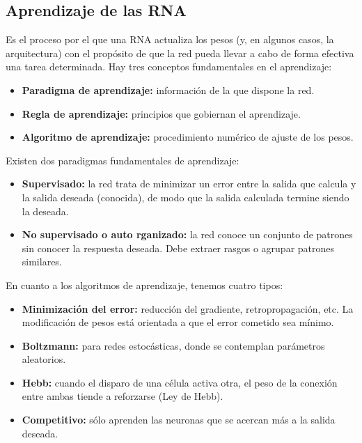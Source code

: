 \documentclass[12pt]{book} %
\begin{document}
		\subsection{Aprendizaje de las RNA}
			 Es el proceso por el que una RNA actualiza los pesos (y, en algunos casos, la arquitectura) con el propósito de que la red pueda llevar a 
			 cabo de forma efectiva una tarea determinada.
			 Hay tres conceptos fundamentales en el aprendizaje:
			 \begin{multicols}{2}
				\begin{itemize}
			 		\item \textbf{Paradigma de aprendizaje:} información de la que dispone la red.
			 	   	\item \textbf{Regla de aprendizaje:} principios que gobiernan el aprendizaje.
			   		 \item \textbf{Algoritmo de aprendizaje:} procedimiento numérico de ajuste de los pesos.
			 	\end{itemize}
			\end{multicols}
			Existen dos paradigmas fundamentales de aprendizaje:
			\begin{multicols}{2}
				\begin{itemize}
			 		\item \textbf{Supervisado:} la red trata de minimizar un error entre la salida que calcula y la salida deseada (conocida), 
			 			de modo que la salida calculada termine siendo la deseada.
			 	   	\item \textbf{No supervisado o auto rganizado:} la red conoce un conjunto de patrones sin conocer la respuesta deseada. 
			 	   		Debe extraer rasgos o agrupar patrones similares.
			 	\end{itemize}
			\end{multicols}
			En cuanto a los algoritmos de aprendizaje, tenemos cuatro tipos:
			\begin{multicols}{2}
				\begin{itemize}
			 		\item \textbf{Minimización del error:} reducción del gradiente, retropropagación, etc. La modificación de pesos está orientada 
			 			a que el error cometido sea mínimo.
			 	   	\item \textbf{Boltzmann: }para redes estocásticas, donde se contemplan parámetros aleatorios.
			 	   	\item \textbf{Hebb:} cuando el disparo de una célula activa otra, el peso de la conexión entre ambas tiende a reforzarse (Ley de Hebb).
			 	   	\item \textbf{Competitivo:} sólo aprenden las neuronas que se acercan más a la salida deseada.
				\end{itemize}
			\end{multicols}
			
\end{document}
